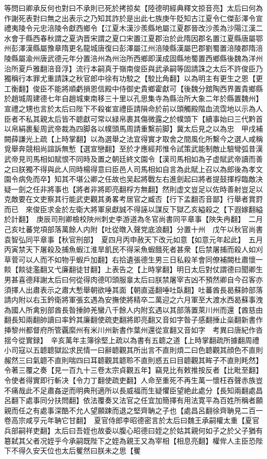 等問曰卿承反何也對曰不承則已死於拷掠矣【陸德明經典釋文掠音亮】太后曰何為作謝死表對曰無之出表示之乃知其詐於是出此七族庚午貶知古江夏令仁傑彭澤令宣禮夷陵令元忠涪陵令獻西鄉令【江夏木漢沙羨縣地屬江夏郡晉改沙羨為沙陽江漢二水會于縣西春秋謂之夏汭晋宋謂之夏口宋置江夏郡治於此隋因郡名置江夏縣唐屬鄂州彭澤漢縣屬豫章隋更名龍城唐復曰彭澤屬江州涪陵縣漢屬巴郡劉蜀置涪陵郡隋涪陵縣屬渝州唐武德元年分置涪州為州治所西鄉即漢成固縣地蜀置西鄉縣後魏為洋州治所夏戶雅翻涪音浮】流行本嗣真于嶺南俊臣與武承嗣等固請誅之太后不許俊臣乃獨稱行本罪尤重請誅之秋官郎中徐有功駮之【駮比角翻】以為明主有更生之恩【更工衡翻】俊臣不能將順虧損恩信殿中侍御史貴鄉霍獻可【後魏分舘陶西界置貴鄉縣於趙城周建德七年自趙城東南移三十里以孔思集寺為縣治所大象二年於縣置魏州】宣禮之甥也言於太后曰陛下不殺崔宣禮臣請隕命於前以頭觸殿階血流霑地以示為人臣者不私其親太后皆不聼獻可常以緑帛裹其傷微露之於幞頭下【續事始曰三代黔首以帛絹裹髪周武帝裁為四脚各以幞頭馬周請重繫前脚】冀太后見之以為忠　甲戌補闕薛謙光上疏【上時掌翻】以為選舉之法宜得實才取舍之間風化所繫今之選人咸稱覓舉奔競相尚諠訴無慙【選宣戀翻】至於才應經邦惟令試策武能制敵止驗彎弧昔漢武帝見司馬相如賦恨不同時及置之朝廷終文園令【漢司馬相如為子虚賦武帝讀而善之曰朕獨不得與此人同時楊得意曰臣邑人司馬相如自言為此賦上召以為郎後為孝文園令病免而卒】知其不堪公卿之任故也吴起將戰左右進劍起曰將者提鼓揮桴臨敵决疑一劍之任非將事也【將者非將即亮翻桴方無翻】然則虚文豈足以佐時善射豈足以克敵要在文吏察其行能武吏觀其勇畧考居官之臧否【行下孟翻否音鄙】行舉者賞罸而已　來俊臣求金於左衛大將軍泉獻誠不得誣以謀反下獄乙亥縊殺之【下遐嫁翻縊於計翻】　庚辰司刑卿檢校陜州刺史李游道為冬官尚書同平章事【陜失冉翻】　二月己亥吐蕃党項部落萬餘人内附【吐從暾入聲党底浪翻】分置十州　戊午以秋官尚書袁智弘同平章事【秋官刑部】　夏四月丙申赦天下改元如意【如意元年起此】　五月丙寅禁天下屠殺及捕魚蝦江淮旱飢民不得采魚蝦餓死者甚衆【后禁屠捕而殺人如刈草菅可以人而不如物乎蝦戶加翻】右拾遺張德生男三日私殺羊會同僚補闕杜肅懷一餤【餤徒濫翻又弋廉翻徒甘翻】上表告之【上時掌翻】明日太后對仗謂德曰聞卿生男甚喜德拜謝太后曰何從得肉德叩頭服辠太后曰朕禁屠宰吉凶不預然卿自今召客亦須擇人出肅表示之肅大慙舉朝欲唾其面【朝直遥翻唾吐臥翻】吐蕃酋長曷蘇帥部落請内附以右玉鈐衛將軍張玄遇為安撫使將精卒二萬迎之六月軍至大渡水西曷蘇事洩為國人所禽别部酋長昝捶帥羌蠻八千餘人内附玄遇以其部落置萊川州而還【酋慈由翻長知兩翻帥讀曰率鈐其廉翻使疏吏翻將即亮翻又音如字昝子感翻捶止橤翻新書作挿黎州都督府所管覊縻州有米川州新書作葉州還從宣翻又音如字　考異曰唐紀作沓揺今從實録】　辛亥萬年主簿徐堅上疏以為書有五聼之道【上時掌翻疏所據翻周禮小司寇以五聼聼獄訟求民情一曰辭聼觀其所出言不直則煩二曰色聼觀其顔色不直則赧然三曰氣聼不直則喘四曰耳聼觀其聼聆不直則惑五曰目聼觀其眸子不直則眊然】令著三覆之奏【見一百九十三卷太宗貞觀五年】竊見比有敕推按反者【比毗至翻】令使者得實即行斬决【令力丁翻使疏吏翻】人命至重死不再生萬一懷枉吞聲赤族豈不痛哉此不足肅姦逆而明典刑適所以長威福而生疑懼臣望絶此處分【長知兩翻處昌呂翻下處事同分扶問翻】依法覆奏又法官之任宜加簡擇有用法寛平為百姓所稱者願親而任之有處事深酷不允人望願踈而退之堅齊聃之子也【處昌呂翻徐齊聃見二百一卷高宗咸亨元年聃它甘翻】　夏官侍郎李昭德密言於太后曰魏王承嗣權太重【夏官兵部嗣祥吏翻】太后曰吾姪也故委以腹心昭德曰姪之於姑其親何如子之於父子猶有簒弑其父者况姪乎今承嗣既陛下之姪為親王又為宰相【相息亮翻】權侔人主臣恐陛下不得久安天位也太后矍然曰朕未之思【矍